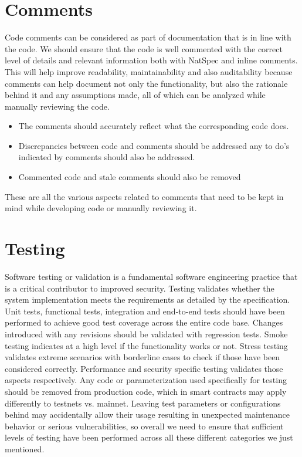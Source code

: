 \section{Comments}
Code comments can be considered as part of documentation that is in line with the code. We should ensure that the code is well commented with the correct level of details and relevant information both with NatSpec and inline comments. This will help improve readability, maintainability and also auditability because comments can help document not only the functionality, but also the rationale behind it and any assumptions made, all of which can be analyzed while manually reviewing the code.

\begin{itemize}
\item The comments should accurately reflect what the corresponding code does.
\item Discrepancies between code and comments should be addressed any to do's indicated by comments should also be addressed.
\item Commented code and stale comments should also be removed
\end{itemize}

These are all the various aspects related to comments that need to be kept in mind while developing code or manually reviewing it.

\section{Testing}
Software testing or validation is a fundamental software engineering practice that is a critical contributor to improved security. Testing validates whether the system implementation meets the requirements as detailed by the specification. Unit tests, functional tests, integration and end-to-end tests should have been performed to achieve good test coverage across the entire code base. Changes introduced with any revisions should be validated with regression tests. Smoke testing indicates at a high level if the functionality works or not. Stress testing validates extreme scenarios with borderline cases to check if those have been considered correctly. Performance and security specific testing validates those aspects respectively. Any code or parameterization used specifically for testing should be removed from production code, which in smart contracts may apply differently to testnets vs. mainnet. Leaving test parameters or configurations behind may accidentally allow their usage resulting in unexpected maintenance behavior or serious vulnerabilities, so overall we need to ensure that sufficient levels of testing have been performed across all these different categories we just mentioned.

